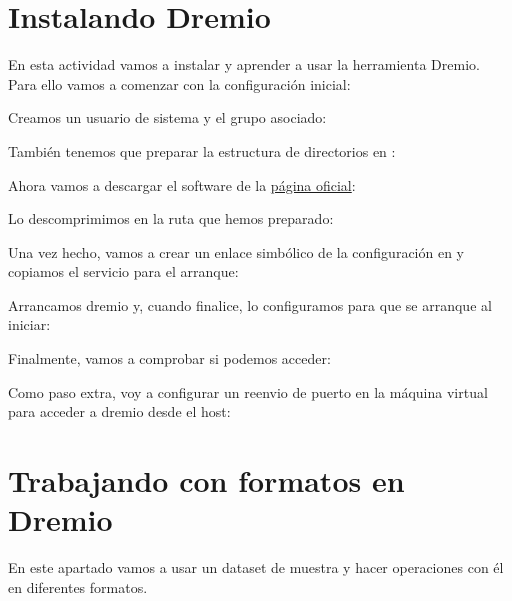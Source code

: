 \documentclass{../../../miPlantilla}
\begin{document}
\maketitle

\section{Instalando Dremio}
En esta actividad vamos a instalar y aprender a usar la herramienta Dremio. Para ello vamos a comenzar con la configuración inicial:

Creamos un usuario de sistema y el grupo asociado:


También tenemos que preparar la estructura de directorios en :


Ahora vamos a descargar el software de la \href{https://download.dremio.com/community-server/}{página oficial}:


\newpage

Lo descomprimimos en la ruta que hemos preparado:


Una vez hecho, vamos a crear un enlace simbólico de la configuración en  y copiamos el servicio para el arranque:


Arrancamos dremio y, cuando finalice, lo configuramos para que se arranque al iniciar:


Finalmente, vamos a comprobar si podemos acceder:


Como paso extra, voy a configurar un reenvio de puerto en la máquina virtual para acceder a dremio desde el host:


\newpage

\section{Trabajando con formatos en Dremio}
En este apartado vamos a usar un dataset de muestra y hacer operaciones con él en diferentes formatos.
\end{document}
